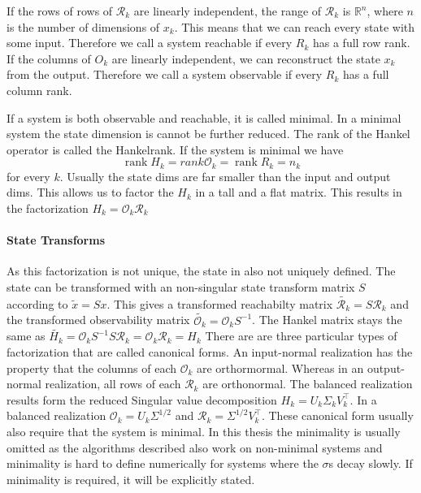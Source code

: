\documentclass[doctype=mastersthesis,BCOR=15mm,biblatex]{ldvbook}%
\DeclareMathOperator{\rank}{rank}
\newcommand{\R}{\mathcal{R}} %
\newcommand{\Ob}{\mathcal{O}} %
\begin{document}
If the rows  of rows of $\R_k$ are linearly independent, the range of $\R_k$ is $\mathbb{R}^n$, where $n$ is the number of dimensions of $x_k$.
This means that we can reach every state with some input.
Therefore we call a system reachable if every $R_k$ has a full row rank.
If the columns of $O_k$ are linearly independent, we can reconstruct the state $x_k$ from the output.  
Therefore we call a system observable if every $R_k$ has a full column rank.

If a system is both observable and reachable, it is called minimal.
In a minimal system the state dimension is cannot be further reduced.
The rank of the Hankel operator is called the Hankelrank. 
If the system is minimal we have 
\begin{equation}
	\rank{H_k} = rank{\Ob_k} = \rank{R_k} = n_k
\end{equation}
for every $k$.
Usually the state dims are far smaller than the input and output dims.
This allows us to factor the $H_k$ in a tall and a flat matrix. 
This results in the factorization $H_k = \Ob_k\R_k$

\paragraph{State Transforms}
As this factorization is not unique, the state in also not uniquely defined. 
The state can be transformed with an non-singular state transform matrix $S$ according to $\tilde{x} =Sx$.
This gives a transformed 
reachabilty matrix $\tilde{\R_k}=S \R_k$ and the transformed
observability matrix $\tilde{\Ob_k}= \Ob_k S^{-1}$. 
The Hankel matrix stays the same as $\tilde{H_k} = \Ob_k S^{-1} S \R_k= \Ob_k \R_k = H_k$
There are are three particular types of factorization that are called canonical forms.
An input-normal realization has the property that the columns of each $\Ob_k$ are orthormormal. Whereas in an output-normal realization, all rows of each $\R_k$ are orthonormal.
The balanced realization results form the reduced Singular value decomposition $H_k = U_k \Sigma_k V_k^\top$. 
In a balanced realization $\Ob_k = U_k \Sigma^{1/2}$ and $\R_k = \Sigma^{1/2} V_k^\top$.
These canonical form usually also require that the system is minimal. In this thesis the minimality is usually omitted as the algorithms described also work on non-minimal systems and minimality is hard to define numerically for systems where the $\sigma$s decay slowly.  If minimality is required, it will be explicitly stated.
\end{document}
